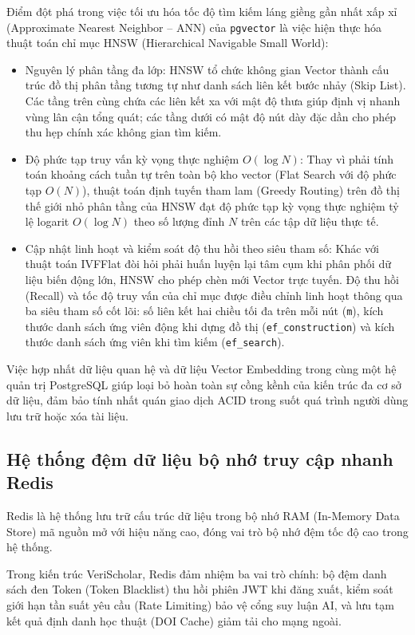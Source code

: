Điểm đột phá trong việc tối ưu hóa tốc độ tìm kiếm láng giềng gần nhất xấp xỉ (Approximate Nearest Neighbor -- ANN) của \texttt{pgvector} là việc hiện thực hóa thuật toán chỉ mục HNSW (Hierarchical Navigable Small World):
\begin{itemize}
    \item Nguyên lý phân tầng đa lớp: HNSW tổ chức không gian Vector thành cấu trúc đồ thị phân tầng tương tự như danh sách liên kết bước nhảy (Skip List). Các tầng trên cùng chứa các liên kết xa với mật độ thưa giúp định vị nhanh vùng lân cận tổng quát; các tầng dưới có mật độ nút dày đặc dần cho phép thu hẹp chính xác không gian tìm kiếm.
    \item Độ phức tạp truy vấn kỳ vọng thực nghiệm $O(\log N)$: Thay vì phải tính toán khoảng cách tuần tự trên toàn bộ kho vector (Flat Search với độ phức tạp $O(N)$), thuật toán định tuyến tham lam (Greedy Routing) trên đồ thị thế giới nhỏ phân tầng của HNSW đạt độ phức tạp kỳ vọng thực nghiệm tỷ lệ logarit $O(\log N)$ theo số lượng đỉnh $N$ trên các tập dữ liệu thực tế.
    \item Cập nhật linh hoạt và kiểm soát độ thu hồi theo siêu tham số: Khác với thuật toán IVFFlat đòi hỏi phải huấn luyện lại tâm cụm khi phân phối dữ liệu biến động lớn, HNSW cho phép chèn mới Vector trực tuyến. Độ thu hồi (Recall) và tốc độ truy vấn của chỉ mục được điều chỉnh linh hoạt thông qua ba siêu tham số cốt lõi: số liên kết hai chiều tối đa trên mỗi nút (\texttt{m}), kích thước danh sách ứng viên động khi dựng đồ thị (\texttt{ef\_construction}) và kích thước danh sách ứng viên khi tìm kiếm (\texttt{ef\_search}).
\end{itemize}

Việc hợp nhất dữ liệu quan hệ và dữ liệu Vector Embedding trong cùng một hệ quản trị PostgreSQL giúp loại bỏ hoàn toàn sự cồng kềnh của kiến trúc đa cơ sở dữ liệu, đảm bảo tính nhất quán giao dịch ACID trong suốt quá trình người dùng lưu trữ hoặc xóa tài liệu.

\subsection{Hệ thống đệm dữ liệu bộ nhớ truy cập nhanh Redis}
\label{subsec:redis}
Redis là hệ thống lưu trữ cấu trúc dữ liệu trong bộ nhớ RAM (In-Memory Data Store) mã nguồn mở với hiệu năng cao, đóng vai trò bộ nhớ đệm tốc độ cao trong hệ thống.

Trong kiến trúc VeriScholar, Redis đảm nhiệm ba vai trò chính: bộ đệm danh sách đen Token (Token Blacklist) thu hồi phiên JWT khi đăng xuất, kiểm soát giới hạn tần suất yêu cầu (Rate Limiting) bảo vệ cổng suy luận AI, và lưu tạm kết quả định danh học thuật (DOI Cache) giảm tải cho mạng ngoài.

